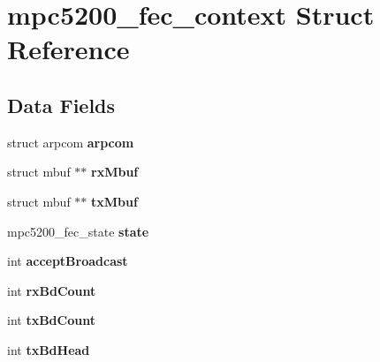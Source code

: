 \hypertarget{structmpc5200__fec__context}{}\section{mpc5200\+\_\+fec\+\_\+context Struct Reference}
\label{structmpc5200__fec__context}
\subsection*{Data Fields}
\begin{DoxyCompactItemize}
\item 
\mbox{\label{structmpc5200__fec__context_ad836e379ccd491e456655c7125099750}} 
struct arpcom {\bfseries arpcom}
\item 
\mbox{\label{structmpc5200__fec__context_a580b617a157644a1a558ba0ecab963df}} 
struct mbuf $\ast$$\ast$ {\bfseries rx\+Mbuf}
\item 
\mbox{\label{structmpc5200__fec__context_a75f71ec6cd68c7d028b09728148ca773}} 
struct mbuf $\ast$$\ast$ {\bfseries tx\+Mbuf}
\item 
\mbox{\label{structmpc5200__fec__context_afb432ea19781cbcbbcb335a3ce5b3077}} 
mpc5200\+\_\+fec\+\_\+state {\bfseries state}
\item 
\mbox{\label{structmpc5200__fec__context_ad222c8c9e9cfee4f0f2776f05caf9996}} 
int {\bfseries accept\+Broadcast}
\item 
\mbox{\label{structmpc5200__fec__context_aa21b95de904593ab5197290f7f1c1314}} 
int {\bfseries rx\+Bd\+Count}
\item 
\mbox{\label{structmpc5200__fec__context_afa9f7851d2aba46cf2a9b43ed77d9014}} 
int {\bfseries tx\+Bd\+Count}
\item 
\mbox{\label{structmpc5200__fec__context_a76e37a5827e2b6e4511a1807ab4a9166}} 
int {\bfseries tx\+Bd\+Head}
\item 
\mbox{\label{structmpc5200__fec__context_ac5ac481a6ea89034f63717c8e5d9c044}} 

\end{DoxyCompactItemize}
